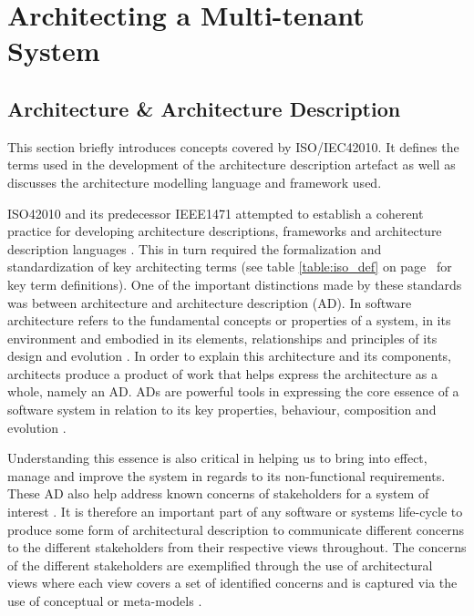 \chapter{Architecting a Multi-tenant System}
\label{chapter:architecting}
\section{Architecture \& Architecture Description} 
This section briefly introduces concepts covered by ISO/IEC42010. It defines the terms used in the development of the architecture description artefact as well as discusses the architecture modelling language and framework used.


ISO42010 and its predecessor IEEE1471 attempted to establish a coherent practice for developing architecture descriptions, frameworks and architecture description languages \cite{InternationalOrganizationOfStandardization2011}. This in turn required the formalization and standardization of key architecting terms (see table \ref{table:iso_def} on page~\pageref{table:iso_def} for key term definitions). One of the important distinctions made by these standards was between architecture and architecture description (AD). In software architecture refers to the fundamental concepts or properties of a system, in its environment and embodied in its elements, relationships and principles of its design and evolution \cite{InternationalOrganizationOfStandardization2011}. In order to explain this architecture and its components, architects produce a product of work that helps express the architecture as a whole, namely an AD. ADs are powerful tools in expressing the core essence of a software system in relation to its key properties, behaviour, composition and evolution \cite{InternationalOrganizationOfStandardization2011}. 

Understanding this essence is also critical in helping us to bring into effect, manage and improve the system in regards to its non-functional requirements. These AD also help address known concerns of stakeholders for a system of interest \cite{Emery2009}. It is therefore an important part of any software or systems life-cycle to produce some form of architectural description to communicate different concerns to the different stakeholders from their respective views throughout. The concerns of the different stakeholders are exemplified through the use of architectural views where each view covers a set of identified concerns and is captured via the use of conceptual or meta-models \cite{42010faq}.



